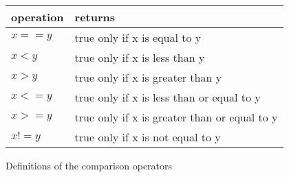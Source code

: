 




\begin {figure}

\begin {tabular} {l l}
	  operation & returns        	\\
	\hline
	$x == y$        & true only if x is equal to y	\\
	$x < y$         & true only if x is less than y	\\
	$x > y$         & true only if x is greater than y	\\
	$x <= y$        & true only if x is less than or equal to y	\\
	$x >= y$        & true only if x is greater than or equal to y	\\
	$x != y$        & true only if x is not equal to y	\\
\end {tabular}



\caption {Definitions of the comparison operators}
\label {fig:comparisonOps}
\end {figure}


